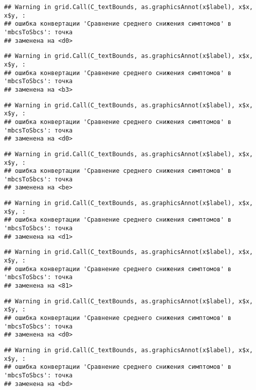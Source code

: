 \documentclass[
]{article}
\begin{document}
\begin{verbatim}
## Warning in grid.Call(C_textBounds, as.graphicsAnnot(x$label), x$x, x$y, :
## ошибка конвертации 'Сравнение среднего снижения симптомов' в 'mbcsToSbcs': точка
## заменена на <d0>
\end{verbatim}

\begin{verbatim}
## Warning in grid.Call(C_textBounds, as.graphicsAnnot(x$label), x$x, x$y, :
## ошибка конвертации 'Сравнение среднего снижения симптомов' в 'mbcsToSbcs': точка
## заменена на <b3>
\end{verbatim}

\begin{verbatim}
## Warning in grid.Call(C_textBounds, as.graphicsAnnot(x$label), x$x, x$y, :
## ошибка конвертации 'Сравнение среднего снижения симптомов' в 'mbcsToSbcs': точка
## заменена на <d0>
\end{verbatim}

\begin{verbatim}
## Warning in grid.Call(C_textBounds, as.graphicsAnnot(x$label), x$x, x$y, :
## ошибка конвертации 'Сравнение среднего снижения симптомов' в 'mbcsToSbcs': точка
## заменена на <be>
\end{verbatim}

\begin{verbatim}
## Warning in grid.Call(C_textBounds, as.graphicsAnnot(x$label), x$x, x$y, :
## ошибка конвертации 'Сравнение среднего снижения симптомов' в 'mbcsToSbcs': точка
## заменена на <d1>
\end{verbatim}

\begin{verbatim}
## Warning in grid.Call(C_textBounds, as.graphicsAnnot(x$label), x$x, x$y, :
## ошибка конвертации 'Сравнение среднего снижения симптомов' в 'mbcsToSbcs': точка
## заменена на <81>
\end{verbatim}

\begin{verbatim}
## Warning in grid.Call(C_textBounds, as.graphicsAnnot(x$label), x$x, x$y, :
## ошибка конвертации 'Сравнение среднего снижения симптомов' в 'mbcsToSbcs': точка
## заменена на <d0>
\end{verbatim}

\begin{verbatim}
## Warning in grid.Call(C_textBounds, as.graphicsAnnot(x$label), x$x, x$y, :
## ошибка конвертации 'Сравнение среднего снижения симптомов' в 'mbcsToSbcs': точка
## заменена на <bd>
\end{verbatim}
\end{document}
